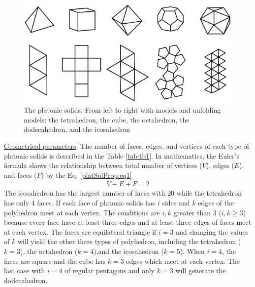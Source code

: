 \begin{figure}[h]
\centering
	\includegraphics[width=1\textwidth]{image/5Platonic1.png}
	\caption{The platonic solids. From left to right with models and unfolding models: the tetrahedron, the cube, the octahedron, the dodecahedron, and the icosahedron}
	\label{fig:platonicSolids}
\end{figure}
%
% 
%
%
%
\noindent \uline{Geometrical parameters}: 
The number of faces, edges, and vertices of each type of platonic solids is described in the Table \ref{tab:tb1}. 
In mathematics, the Euler's formula shows the relationship between total number of vertices ($V$), edges ($E$), and faces ($F$) by the Eq. \ref{platSolProp:eq1}
%
\begin{equation} 
\label{platSolProp:eq1}
\begin{split}
V-E+F=2
\end{split}
\end{equation}
% 
The icosahedron has the largest number of faces with $20$ while the tetrahedron has only $4$ faces. 
If each face of platonic solids has $i$ sides and $k$ edges of the polyhedron meet at each vertex.
The conditions are $i,k$ greater than $3$ ($i,k\geq3$) because every face have at least three edges and at least three edges of faces meet at each vertex.
The faces are equilateral triangle if $i=3$ and changing the values of $k$ will yield the other three types of polyhedron, including the tetrahedron ($k=3$), the octahedron ($k=4$),and the icosahedron ($k=5$). When $i=4$, the faces are square and the cube has $k=3$ edges which meet at each vertex. The last case with $i=4$ of regular pentagons and only $k=3$ will generate the dodecahedron. \\

